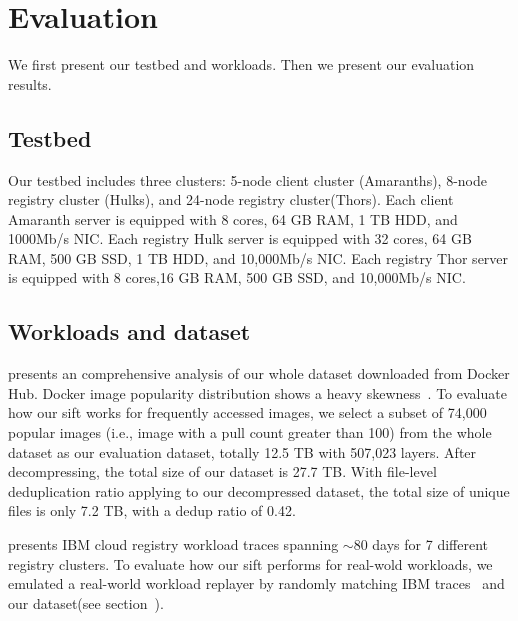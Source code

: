 \section{ Evaluation}
\label{sec:Evaluation}


We first present our testbed and workloads.
Then we present our evaluation results.
\subsection{Testbed}

Our testbed includes three clusters: 
5-node client cluster (Amaranths),
8-node registry cluster (Hulks), and
24-node registry cluster(Thors).
Each client Amaranth server is equipped with 8 cores, 64 GB RAM, 1 TB HDD, and 1000Mb/s NIC.
Each registry Hulk server is equipped with 32 cores, 64 GB RAM, 500 GB SSD, 1 TB HDD, and 10,000Mb/s NIC. 
Each registry Thor server is equipped with 8 cores,16 GB RAM, 500 GB SSD, and 10,000Mb/s NIC. 
\subsection{Workloads and dataset}
\cite{xxx} presents an comprehensive analysis of our whole dataset downloaded from Docker Hub. 
Docker image popularity distribution shows a heavy skewness~\cite{xxx}.
To evaluate how our sift works for frequently accessed images,
we select a subset of 74,000 popular images (i.e., image with a pull count greater than 100) from the whole dataset 
as our evaluation dataset, 
totally 12.5 TB with 507,023 layers.
After decompressing,  the total size of our dataset is 27.7 TB.
With file-level deduplication ratio applying to our decompressed dataset, 
the total size of unique files is only 7.2 TB, with a dedup ratio of 0.42.

\cite{xxx} presents IBM cloud registry workload traces spanning $\sim$80 days for 7 different registry clusters. 
To evaluate how our sift performs for real-wold workloads,
we emulated a real-world workload replayer by randomly matching IBM traces~\cite{xxx} and our dataset(see section~\cite{xxx}). 



